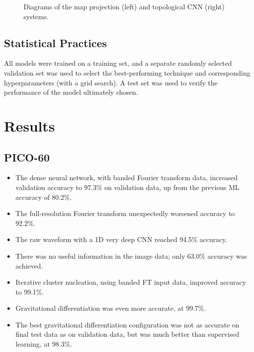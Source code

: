 \documentclass[12pt]{article}
\begin{document}
\begin{figure}[ht]
    \centering
    \qquad
    \caption{Diagrams of the map projection (left) and topological CNN (right) systems.}
\end{figure}

\subsection{Statistical Practices}

All models were trained on a training set, and a separate randomly selected validation set was used to select the best-performing technique and corresponding hyperparameters (with a grid search). A test set was used to verify the performance of the model ultimately chosen.

\section{Results}

\subsection{PICO-60}

\begin{itemize}
    \item The dense neural network, with banded Fourier transform data, increased validation accuracy to 97.3\% on validation data, up from the previous ML accuracy of 80.2\%.
    \item The full-resolution Fourier transform unexpectedly worsened accuracy to 92.2\%.
    \item The raw waveform with a 1D very deep CNN reached 94.5\% accuracy.
    \item There was no useful information in the image data; only 63.0\% accuracy was achieved.
    \item Iterative cluster nucleation, using banded FT input data, improved accuracy to 99.1\%.
    \item Gravitational differentiation was even more accurate, at 99.7\%.
    \item The best gravitational differentiation configuration was not as accurate on final test data as on validation data, but was much better than supervised learning, at 98.3\%.
\end{itemize}
\end{document}
